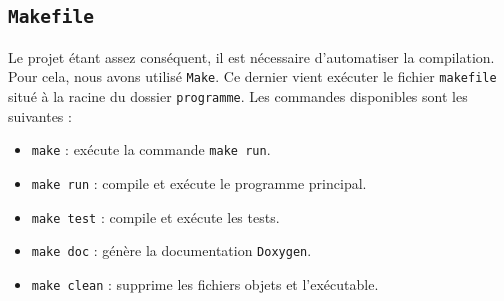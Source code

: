 \subsection{\texttt{Makefile}}

Le projet étant assez conséquent, il est nécessaire d'automatiser la compilation.
Pour cela, nous avons utilisé \texttt{Make}.
Ce dernier vient exécuter le fichier \texttt{makefile} situé à la racine du dossier \texttt{programme}.
Les commandes disponibles sont les suivantes :
\begin{itemize}
    \item \texttt{make} : exécute la commande \texttt{make run}.
    \item \texttt{make run} : compile et exécute le programme principal.
    \item \texttt{make test} : compile et exécute les tests.
    \item \texttt{make doc} : génère la documentation \texttt{Doxygen}.
    \item \texttt{make clean} : supprime les fichiers objets et l'exécutable.
\end{itemize}